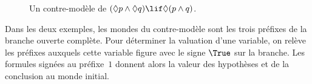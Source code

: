 \documentclass[../../../include/open-logic-section]{subfiles}
\begin{document}
{\begin{ex}
\begin{figure}
\begin{center}
  \end{center}
  \caption{Un contre-modèle de $(\Diamond p \land \Diamond q) \lif
    \Diamond (p \land q)$.}
\end{figure}
\end{ex}          
}
\begin{explain}
Dans les deux exemples, les mondes du contre-modèle sont
les trois préfixes de la branche ouverte complète. Pour
déterminer la valuation d'une variable, on relève les
préfixes auxquels cette variable figure avec le signe
$\True$ sur la branche. Les formules signées au préfixe~$1$
donnent alors la valeur des hypothèses et de la conclusion
au monde initial.
\end{explain}
\end{document}
